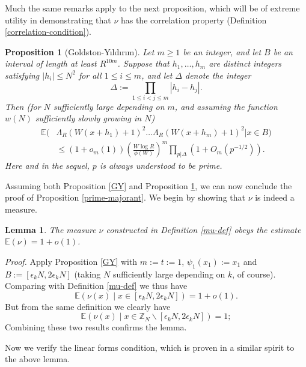 \documentclass[12pt,a4paper,reqno]{amsart}
\numberwithin{equation}{section}
\theoremstyle{plain}
\newtheorem{proposition}[subsection]{Proposition}
\newtheorem{lemma}[subsection]{Lemma}
\theoremstyle{definition}
\renewcommand{\leq}{\leqslant}
\renewcommand{\geq}{\geqslant}
\def\Z{{\mathbb Z}}
\def\E{{\mathbb E}}
\def\w{w}
\def\vs{\vspace{11pt}}
\def\ni{\noindent}
\def\proof{\noindent\textit{Proof. }}
\def\endproof{\hfill{\usebox{\proofbox}}}
\begin{document}
\ni Much the same remarks apply to the next proposition, which will be of extreme utility in demonstrating that $\nu$ has the correlation property (Definition \ref{correlation-condition}).

\begin{proposition}[Goldston-Y{\i}ld{\i}r{\i}m]\label{GY2}
Let $m \geq 1$ be an integer, and let $B$ be an interval of length  at least $R^{10m}$. Suppose that $h_1,\dots,h_m$ are distinct integers satisfying $|h_i| \leq N^2$ for all $1 \leq i \leq m$, and let $\Delta$ denote the integer
\[ \Delta := \prod_{1 \leq i < j \leq m} |h_i - h_j|.\]
Then (for $N$ sufficiently large depending on $m$, and assuming the function $\w(N)$ sufficiently slowly growing in $N$)
\begin{equation}\label{GY2-est}
\begin{split}
 \E( &\Lambda_R(W(x + h_1) + 1)^2 \dots \Lambda_R(W(x + h_m) + 1)^2| x \in B ) \\
&\leq (1 + o_m(1))
\left( \frac{W\log R}{\phi(W)}\right)^m \prod_{p | \Delta}(1 + O_m(p^{-1/2})).
\end{split}
\end{equation}
Here and in the sequel, $p$ is always understood to be prime.
\end{proposition}

\ni Assuming both Proposition \ref{GY} and Proposition \ref{GY2}, we can now
conclude the proof of Proposition \ref{prime-majorant}.  We begin by showing that $\nu$ is indeed a measure.

\begin{lemma}\label{nu-measure} The measure $\nu$ constructed in Definition \ref{mu-def} obeys the estimate
$\mathbb{E}(\nu) = 1 + o(1)$.
\end{lemma}
\proof Apply Proposition \ref{GY} with $m := t := 1$, $\psi_1(x_1) := x_1$ and $B := [\epsilon_k N, 2\epsilon_k N]$ (taking $N$
sufficiently large depending on $k$, of course). Comparing with Definition \ref{mu-def} we thus have
\[ \E (\nu(x) \; | \; x \in [\epsilon_k N, 2\epsilon_k N]) = 1 + o(1).\]
But from the same definition we clearly have
\[ \E (\nu(x) \; | \; x \in \Z_N \backslash [\epsilon_k N, 2\epsilon_k N] ) = 1;\]
Combining these two results confirms the lemma.\endproof\vs

\ni Now we verify the linear forms condition, which is proven in a similar spirit to the above lemma.
\end{document}
